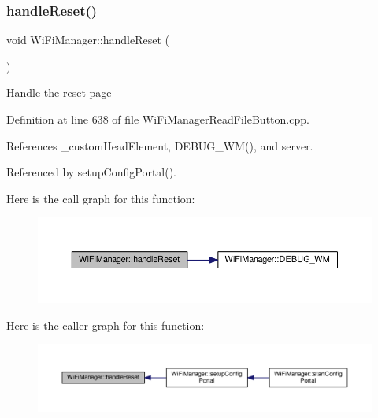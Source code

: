 \subsubsection{\texorpdfstring{handle\+Reset()}{handleReset()}}
{\footnotesize\ttfamily void Wi\+Fi\+Manager\+::handle\+Reset (\begin{DoxyParamCaption}{ }\end{DoxyParamCaption})\hspace{0.3cm}{\ttfamily [private]}}

Handle the reset page 

Definition at line 638 of file Wi\+Fi\+Manager\+Read\+File\+Button.\+cpp.



References \+\_\+custom\+Head\+Element, D\+E\+B\+U\+G\+\_\+\+W\+M(), and server.



Referenced by setup\+Config\+Portal().

Here is the call graph for this function\+:
\nopagebreak
\begin{figure}[H]
\begin{center}
\leavevmode
\includegraphics[width=350pt]{d4/dc8/class_wi_fi_manager_a94fb1a8fcfbd0d02714c69138bf72f9c_cgraph}
\end{center}
\end{figure}
Here is the caller graph for this function\+:
\nopagebreak
\begin{figure}[H]
\begin{center}
\leavevmode
\includegraphics[width=350pt]{d4/dc8/class_wi_fi_manager_a94fb1a8fcfbd0d02714c69138bf72f9c_icgraph}
\end{center}
\end{figure}
\mbox{\label{class_wi_fi_manager_a7d01f7de3e4b76acdabffac79fa3d0ab}} 
